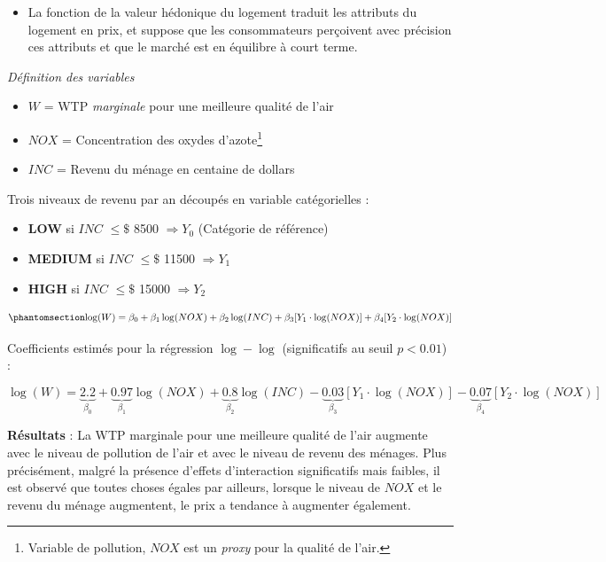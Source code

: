 \documentclass[
  12pt,
]{report}
\providecommand{\tightlist}{%
  \setlength{\itemsep}{0pt}\setlength{\parskip}{0pt}}\usepackage{longtable,booktabs,array}
\begin{document}
\newpage

\begin{itemize}
\tightlist
\item
  La fonction de la valeur hédonique du logement traduit les attributs
  du logement en prix, et suppose que les consommateurs perçoivent avec
  précision ces attributs et que le marché est en équilibre à court
  terme.
\end{itemize}

\emph{Définition des variables}

\begin{itemize}
\tightlist
\item
  \(W\) = WTP \emph{marginale} pour une meilleure qualité de l'air
\item
  \(NOX\) = Concentration des oxydes d'azote\footnote{Variable de
    pollution, \(NOX\) est un \emph{proxy} pour la qualité de l'air.}
\item
  \(INC\) = Revenu du ménage en centaine de dollars
\end{itemize}

Trois niveaux de revenu par an découpés en variable catégorielles :

\begin{itemize}
\tightlist
\item
  \textbf{LOW} si \(INC\) \(\leq \$\) 8500 \(\Rightarrow Y_0\)
  (Catégorie de référence)
\item
  \textbf{MEDIUM} si \(INC\) \(\leq \$\) 11500 \(\Rightarrow Y_1\)
\item
  \textbf{HIGH} si \(INC\) \(\leq \$\) 15000 \(\Rightarrow Y_2\)
\end{itemize}

\begin{equation}\phantomsection\label{eq-WTP1}{
\log(W) = \beta_0 + \beta_1 \log(NOX) + \beta_2 \log(INC) + \beta_3[Y_1 \cdot \log(NOX)] + \beta_4[Y_2 \cdot \log(NOX)]
}\end{equation}

Coefficients estimés pour la régression \(\log-\log\) (significatifs au
seuil \(p<0.01\)) :

\[
\log(W) = \underbrace{2.2}_{\beta_0} + \underbrace{0.97}_{\beta_1} \log(NOX) + \underbrace{0.8}_{\beta_2} \log(INC) - \underbrace{0.03}_{\beta_3}[Y_1 \cdot \log(NOX)] - \underbrace{0.07}_{\beta_4}[Y_2 \cdot \log(NOX)]
\]

\textbf{Résultats} : La WTP marginale pour une meilleure qualité de
l'air augmente avec le niveau de pollution de l'air et avec le niveau de
revenu des ménages. Plus précisément, malgré la présence d'effets
d'interaction significatifs mais faibles, il est observé que toutes
choses égales par ailleurs, lorsque le niveau de \(NOX\) et le revenu du
ménage augmentent, le prix a tendance à augmenter également.
\end{document}
